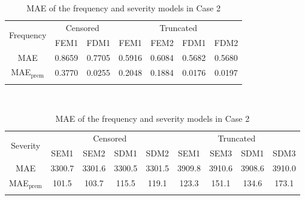 \begin{table}[!h]
\renewcommand{\tabcolsep}{0.8mm}
\renewcommand{\arraystretch}{1}
\footnotesize
\centering
{\color{blue}
\begin{tabular}[h]{ccccccc}
\toprule
\multirow{2}{*}{Frequency} & \multicolumn{2}{c}{Censored} & \multicolumn{4}{c}{Truncated}\\
\cmidrule(l{3pt}r{3pt}){2-3} \cmidrule(l{3pt}r{3pt}){4-7}
 & FEM1 & FDM1 & FEM1 & FEM2 & FDM1 & FDM2\\
\midrule
MAE & 0.8659 & 0.7705 & 0.5916 & 0.6084 & 0.5682 & 0.5680 \\
MAE$_{\text{prem}}$ & 0.3770 & 0.0255 & 0.2048 & 0.1884 & 0.0176 & 0.0197 \\
\hhline{=======}
\end{tabular}
\\
\vspace{0.3cm}
\begin{tabular}[h]{ccccccccc}
\toprule
\multirow{2}{*}{Severity} & \multicolumn{4}{c}{Censored} & \multicolumn{4}{c}{Truncated}\\
\cmidrule(l{3pt}r{3pt}){2-5} \cmidrule(l{3pt}r{3pt}){6-9}
 & SEM1 & SEM2 & SDM1 & SDM2 & SEM1 & SEM3 & SDM1 & SDM3\\
\midrule
MAE & 3300.7 & 3301.6 & 3300.5 & 3301.5 & 3909.8 & 3910.6 & 3908.6 & 3910.0 \\
MAE$_{\text{prem}}$ & 101.5 & 103.7 & 115.5 & 119.1 & 123.3 & 151.1 & 134.6 & 173.1 \\
\hhline{=========}
\end{tabular}
}
\caption{MAE of the frequency and severity models in Case 2}\label{tab:maecase2}
\end{table}
